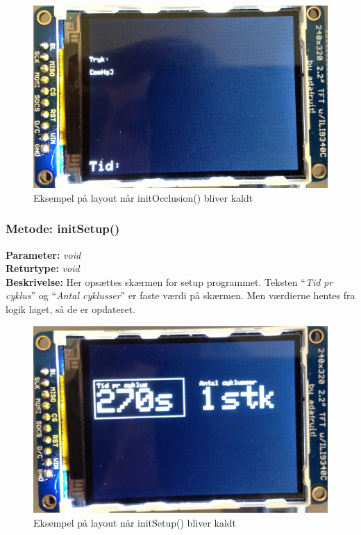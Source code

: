 \begin{figure}[H]
	\includegraphics[width=\textwidth]{billeder/occlusion.png}
	\caption{Eksempel på layout når initOcclusion() bliver kaldt}\label{pic:occlusion}
\end{figure}

\subsubsection{Metode: initSetup()}
\textbf{Parameter: } \textit{void}
\\ \textbf{Returtype: } \textit{void}
\\ \textbf{Beskrivelse: } Her opsættes skærmen for setup programmet. Teksten “\textit{Tid pr cyklus}” og “\textit{Antal cyklusser}” er faste værdi på skærmen. Men værdierne hentes fra logik laget, så de er opdateret. 

\begin{figure}[H]
	\includegraphics[width=\textwidth]{billeder/setup.png}
	\caption{Eksempel på layout når initSetup() bliver kaldt}\label{pic:setup}
\end{figure}

